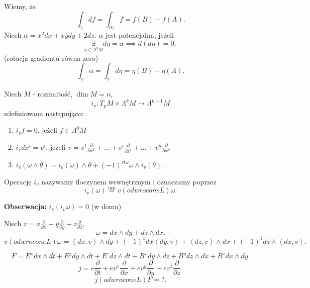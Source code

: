 \documentclass[../main.tex]{subfiles}
\begin{document}
Wiemy, że
\[
    \int_{\gamma}df = \int_{\partial\gamma}f = f(B) - f(A)
.\]
Niech $\alpha = x^2dx + xydy + 2dz$. $\alpha$ jest potencjalna, jeżeli
\[
    \underset{\eta\in \Lambda^0M}{\exists} d\eta = \alpha \implies d(d\eta) = 0
,\]
(rotacja gradientu równa zero)
\[
    \int_{\gamma}\alpha = \int_{\gamma}d\eta = \eta(B) - \eta(A)
.\]
\begin{definicja}
    Niech $M$ - rozmaitość, $\dim M = n$,\\
    \[
        i_v : T_pM \times \Lambda^kM\to \Lambda^{k-1}M
    \]
    zdefiniowana następująco:
    \begin{enumerate}
        \item $i_v f = 0$, jeżeli $f\in \Lambda^0M$
        \item  $i_v dx^i = v^i$, jeżeli $v = v^1 \frac{\partial }{\partial x^1} + \ldots + v^i \frac{\partial }{\partial x^i} + \ldots + v^n \frac{\partial }{\partial x^n} $
        \item $i_v(\omega\land \theta) = i_v(\omega)\land \theta + (-1)^{st \omega} \omega\land i_v(\theta)$.
    \end{enumerate}
    Operację $i_v$ nazywamy iloczynem wewnętrznym i oznaczamy poprzez
    \[
        i_v(\omega) \overset{\text{ozn}}{=} v (odwrocone L) \omega
    .\]
\end{definicja}
\textbf{Obserwacja:} $i_v(i_v\omega) = 0 $ (w domu)
\begin{przyklad}
    Niech $v = x \frac{\partial }{\partial x} + y \frac{\partial }{\partial y} + z \frac{\partial }{\partial z} $,
    \[
    \omega = dx\land dy + dz \land dx
    .\]
\[
    v (odwrocone L) \omega = \left<dx, v \right> \land dy + (-1)^1 dx\left<dy,v \right> + \left<dz, v \right>\land dx + (-1)^1 dz\land \left<dx, v \right>
.\]
\end{przyklad}
\begin{przyklad}
    \[
     F = E^xdx\land dt + E^ydy\land dt + E^z dz\land dt + B^x dy\land dz + B^ydz\land dx + B^zdx\land dy
    .\]
\[
j = e \frac{\partial }{\partial t} + ev^x \frac{\partial }{\partial x}  + ev^y \frac{\partial }{\partial y} + ev^z \frac{\partial }{\partial z}
.\]
\[
    j (odwrocone L) F = ?
.\]
\end{przyklad}
\end{document}
